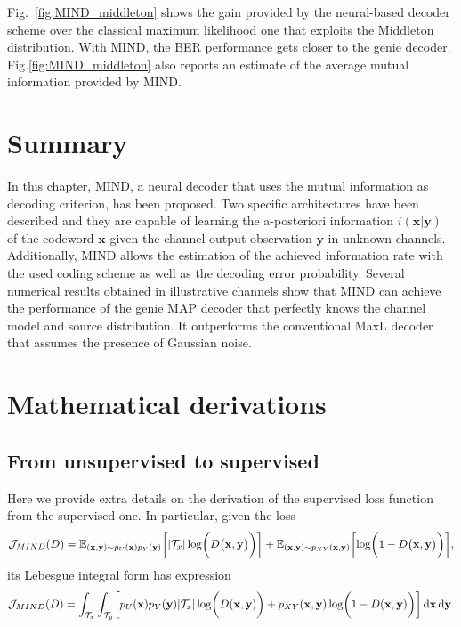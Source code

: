 Fig.~\ref{fig:MIND_middleton} shows the gain provided by the neural-based decoder scheme over the classical maximum likelihood one that exploits the Middleton distribution. With MIND, the BER performance gets closer to the genie decoder. Fig.\ref{fig:MIND_middleton} also reports an estimate of the average mutual information provided by MIND.

\section{Summary}
\label{sec:MIND_conclusions}
In this chapter, MIND, a neural decoder that uses the mutual information as decoding criterion, has been proposed. Two specific architectures have been described and they are capable of learning the a-posteriori information $i(\mathbf{x}|\mathbf{y})$ of the codeword $\mathbf{x}$ given the channel output observation $\mathbf{y}$ in unknown channels. Additionally, MIND allows the estimation of the achieved information rate with the used coding scheme as well as the decoding error probability. Several numerical results obtained in illustrative channels show that MIND can achieve the performance of the genie MAP decoder that perfectly knows the channel model and source distribution. It outperforms the conventional MaxL decoder that assumes the presence of Gaussian noise. 

\newpage
\section{Mathematical derivations}
\label{sec:mind_appendix}
\subsection{From unsupervised to supervised}
Here we provide extra details on the derivation of the supervised loss function from the supervised one. In particular, given the loss
\begin{equation}
\small
\mathcal{J}_{MIND}(D) =  \mathbb{E}_{(\mathbf{x},\mathbf{y}) \sim p_{U}(\mathbf{x})p_{Y}(\mathbf{y})}\biggl[|\mathcal{T}_x|\log \biggl(D\bigl(\mathbf{x},\mathbf{y}\bigr)\biggr)\biggr] + \mathbb{E}_{(\mathbf{x},\mathbf{y}) \sim p_{XY}(\mathbf{x},\mathbf{y})}\biggl[\log \biggl(1-D\bigl(\mathbf{x},\mathbf{y}\bigr)\biggr)\biggr],
\end{equation}
its Lebesgue integral form has expression
\begin{equation}
    \small
    \mathcal{J}_{MIND}(D) = \int_{\mathcal{T}_x} \int_{\mathcal{T}_y}\biggl[p_{U}(\mathbf{x})p_Y(\mathbf{y})|\mathcal{T}_x| \log \biggl(D(\mathbf{x},\mathbf{y})\biggr) + p_{XY}(\mathbf{x},\mathbf{y}) \log \biggl(1-D(\mathbf{x},\mathbf{y})\biggr)\biggr] \mathop{}\!\mathrm{d} \mathbf{x} \mathop{}\!\mathrm{d} \mathbf{y}.
\end{equation}

